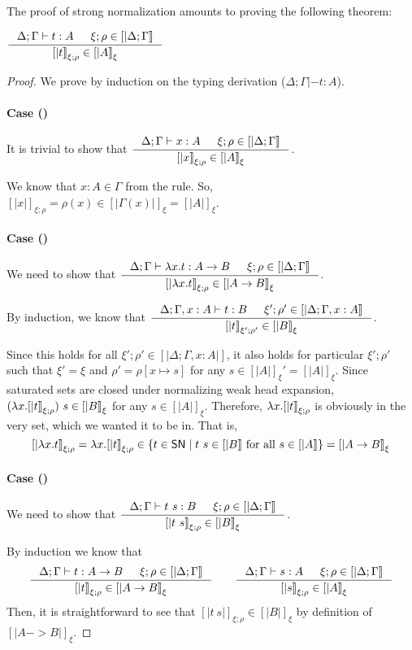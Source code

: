 The proof of strong normalization amounts to proving the following theorem:
\begin{theorem}
$ \inference{\Delta;\Gamma|- t:A & \xi;\rho \in [|\Delta;\Gamma|]}
	    {[|t|]_{\xi;\rho} \in [|A|]_\xi} $
\end{theorem}
\begin{proof}
We prove by induction on the typing derivation ($\Delta;\Gamma|- t:A$).
\paragraph{Case ()}
It is trivial to show that
$ \inference{\Delta;\Gamma |- x:A & \xi;\rho \in [|\Delta;\Gamma|]}
	{[|x|]_{\xi;\rho} \in [|A|]_\xi} $.

We know that $x:A \in \Gamma$ from the  rule.
So, $[|x|]_{\xi;\rho} =\rho(x)\in[|\Gamma(x)|]_\xi = [|A|]_\xi$.

\paragraph{Case ()}
We need to show that
$ \inference{\Delta;\Gamma |- \l x.t : A -> B & \xi;\rho \in [|\Delta;\Gamma|]}
	{[|\l x.t|]_{\xi;\rho} \in [|A -> B|]_\xi} $.

By induction, we know that
$ \inference{\Delta;\Gamma,x:A |- t : B & \xi';\rho' \in [|\Delta;\Gamma,x:A|]}
	     {[|t|]_{\xi';\rho'} \in [|B|]_\xi} $.

Since this holds for all $\xi';\rho' \in [|\Delta;\Gamma,x:A|]$, it also holds
for particular $\xi';\rho'$ such that $\xi'=\xi$ and
$\rho' = \rho[x \mapsto s]$ for any $s \in [|A|]_\xi' = [|A|]_\xi$.
Since saturated sets are closed under normalizing weak head expansion,
$(\lambda x.[|t|]_{\xi;\rho})~s \in[|B|]_\xi$ for any $s\in[|A|]_\xi$.
Therefore, $\lambda x.[|t|]_{\xi;\rho}$ is obviously in the very set,
which we wanted it to be in. That is,
\[
[|\lambda x.t|]_{\xi;\rho} = \lambda x.[|t|]_{\xi;\rho}
\in \{t\in \mathsf{SN} \mid t~s\in[|B|] ~\text{for all}~ s\in[|A|]\} 
= [|A -> B|]_\xi
\]

\paragraph{Case ()}
We need to show that
$ \inference{\Delta;\Gamma |- t~s : B & \xi;\rho\in[|\Delta;\Gamma|]}{[|t~s|]_{\xi;\rho} \in [|B|]_\xi} $.

By induction we know that
\[
\inference{\Delta;\Gamma |- t : A -> B & \xi;\rho\in[|\Delta;\Gamma|]}{[|t|]_{\xi;\rho} \in [|A -> B|]_\xi}
\qquad
\inference{\Delta;\Gamma |- s : A & \xi;\rho\in[|\Delta;\Gamma|]}{[|s|]_{\xi;\rho} \in [|A|]_\xi}
\]
Then, it is straightforward to see that $[|t~s|]_{\xi;\rho}\in[|B|]_\xi$
by definition of $[|A -> B|]_\xi$.


\end{proof}
